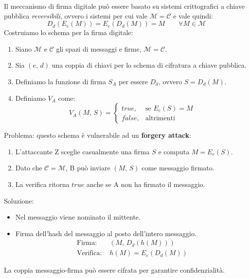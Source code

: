 \documentclass[a4paper, 11pt, twoside, openright, fleqn]{report}
\begin{document}
\noindent Il meccanismo di firma digitale può essere basato su sistemi crittografici a chiave pubblica \emph{reversibili}, ovvero i sistemi per cui vale $\mathcal{M} = \mathcal{C}$ e vale quindi:
\begin{equation*}
	D_d(E_e(M)) = E_e(D_d(M)) = M\qquad \forall M\in\mathcal{M}
\end{equation*}
Costruiamo lo schema per la firma digitale:
\begin{enumerate}
	\item Siano $\mathcal{M}$ e $\mathcal{C}$ gli spazi di messaggi e firme, $\mathcal{M} = \mathcal{C}$.
	\item Sia $(e,\,d)$ una coppia di chiavi per lo schema di cifratura a chiave pubblica.
	\item Definiamo la funzione di firma $S_A$ per essere $D_d$, ovvero $S=D_d(M)$.
	\item Definiamo $V_A$ come:
	\begin{equation*}
		V_A(M,\,S) =
		\begin{cases}
		true,& \mbox{se }E_e(S) = M\\
		false,& \mbox{altrimenti}
		\end{cases}
	\end{equation*}
\end{enumerate}
Problema: questo schema è vulnerabile ad un \textbf{forgery attack}:
\begin{enumerate}
	\item L'attaccante Z sceglie casualmente una firma $S$ e computa $M=E_e(S)$.
	\item Dato che $\mathcal{C} = \mathcal{M}$, B può inviare $(M,\,S)$ come messaggio firmato.
	\item La verifica ritorna $true$ anche se A non ha firmato il messaggio.
\end{enumerate}
Soluzione:
\begin{itemize}
	\item Nel messaggio viene nominato il mittente.
	\item Firma dell'hash del messaggio al posto dell'intero messaggio.
	\begin{align*}
		\mbox{Firma: } &(M,\,D_d(h(M)))\\
		\mbox{Verifica: } &h(M) = E_e(D_d(M))
	\end{align*}
\end{itemize}
La coppia messaggio-firma può essere cifrata per garantire confidenzialità.
\end{document}
